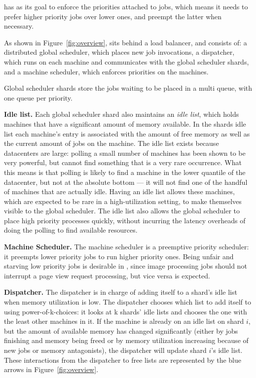 \Sys{} has as its goal to enforce the priorities attached to jobs, which means
it needs to prefer higher priority jobs over lower ones, and preempt the latter
when necessary.
  

As shown in Figure~\ref{fig:overview}, \sys{} sits behind a load balancer, and
consists of: a distributed global scheduler, which places new job invocations, a
dispatcher, which runs on each machine and communicates with the global
scheduler shards, and a machine scheduler, which enforces priorities on the
machines.

Global scheduler shards store the jobs waiting to be placed in a multi queue,
with one queue per priority.

\textbf{Idle list.}
Each global scheduler shard also maintains an \textit{idle list}, which holds
machines that have a significant amount of memory available. In the shards idle
list each machine's entry is associated with the amount of free memory as well
as the current amount of jobs on the machine. The idle list exists because
datacenters are large: polling a small number of machines has been shown to be
very powerful, but cannot find something that is a very rare occurrence.
What this means is that polling is likely to find a machine in the lower
quantile of the datacenter, but not at the absolute bottom --- it will not find
one of the handful of machines that are actually idle. Having an idle list
allows these machines, which are expected to be rare in a high-utilization
setting, to make themselves visible to the global scheduler. The idle list also
allows the global scheduler to place high priority processes quickly, without
incurring the latency overheads of doing the polling to find available
resources.


\textbf{Machine Scheduler.}
The machine scheduler is a preemptive priority scheduler: it preempts lower
priority jobs to run higher priority ones. Being unfair and starving low
priority jobs is desirable in \sys{}, since image processing jobs should not
interrupt a page view request processing, but vice versa is expected.


\textbf{Dispatcher.}
The dispatcher is in charge of adding itself to a shard's idle list when memory
utilization is low. The dispatcher chooses which list to add itself to using
power-of-k-choices: it looks at k shards' idle lists and chooses the one with
the least other machines in it. If the machine is already on an idle list on
shard $i$, but the amount of available memory has changed significantly (either
by jobs finishing and memory being freed or by memory utilization increasing
because of new jobs or memory antagonists), the dispatcher will update shard
$i$'s idle list. These interactions from the dispatcher to free lists are
represented by the blue arrows in Figure~\ref{fig:overview}.

